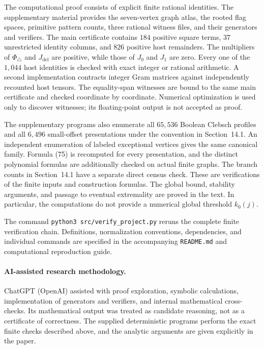 \documentclass[11pt]{amsart}
\theoremstyle{definition}
\theoremstyle{remark}
\begin{document}
The computational proof consists of explicit finite rational identities.
The supplementary material provides the seven-vertex graph atlas, the
rooted flag spaces, primitive pattern counts, three rational witness
files, and their generators and verifiers. The main certificate contains
$184$ positive square terms, $37$ unrestricted identity columns, and
$826$ positive host remainders. The multipliers of $\Phi_\triangle$ and
$J_{\mathrm{del}}$ are positive, while those of $J_0$ and $J_1$ are zero.
Every one of the $1,044$ host identities is checked with exact integer or
rational arithmetic. A second implementation contracts integer Gram
matrices against independently recounted host tensors. The equality-span
witnesses are bound to the same main certificate and checked coordinate
by coordinate. Numerical optimization is used only to discover witnesses;
its floating-point output is not accepted as proof.

The supplementary programs also enumerate all $65,536$ Boolean Clebsch
profiles and all $6,496$ small-offset presentations under the convention
in Section~14.1. An independent enumeration of labeled exceptional
vertices gives the same canonical family. Formula (75) is recomputed for
every presentation, and the distinct polynomial formulas are additionally
checked on actual finite graphs. The branch counts in Section~14.1 have
a separate direct census check. These are verifications of the finite
inputs and construction formulas. The global bound, stability arguments,
and passage to eventual extremality are proved in the text. In
particular, the computations do not provide a numerical global threshold
$k_0(j)$.

The command \texttt{python3 src/verify\_project.py} reruns the complete
finite verification chain. Definitions, normalization conventions,
dependencies, and individual commands are specified in the accompanying
\texttt{README.md} and computational reproduction guide.

\paragraph{AI-assisted research methodology.}
ChatGPT (OpenAI) assisted with proof exploration, symbolic calculations,
implementation of generators and verifiers, and internal mathematical
cross-checks. Its mathematical output was treated as candidate reasoning,
not as a certificate of correctness. The supplied deterministic programs
perform the exact finite checks described above, and the analytic
arguments are given explicitly in the paper. 
\end{document}
